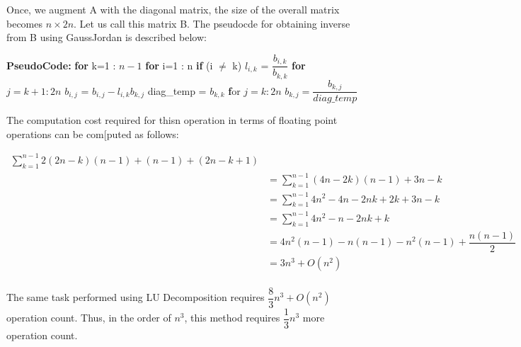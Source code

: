 \documentclass{article}
\newcommand\pseudoCode{\vspace{.10in}\textbf{PseudoCode: }}
\begin{document}
Once, we augment A with  the diagonal matrix, the size of the overall matrix becomes $n \times 2n$. Let us call this matrix B. The pseudocde for obtaining inverse from B using GaussJordan is described below: \newline

\pseudoCode \newline
\hspace*{0.5cm} \textbf {for} k=1 : $n-1$ \newline
\hspace*{1cm}      \textbf {for} i=1 : n \newline
\hspace*{1.5cm}     \textbf {if} (i $\neq$ k) \newline
\hspace*{2cm}            $l_{i,k}$ = $\dfrac{b_{i,k}}{b_{k,k}}$ \newline
\hspace*{2cm}               \textbf {for} $j=k+1 : 2n$ \newline
\hspace*{2.5cm}               $ b_{i,j}$ =  $b_{i,j} - l_{i,k}b_{k,j}$ \newline
\hspace*{1cm}    diag\_temp = $b_{k,k}$ \newline
\hspace*{1cm}    \textbf for $j=k:2n$ \newline
\hspace*{1.5cm}                 $b_{k,j} = \dfrac{b_{k,j}}{diag\_temp}$ \newline

The computation cost required for thisn operation in terms of floating point operations can be com[puted as follows: \newline
  
\begin{align*}
  \sum_{k=1}^{n-1} 2(2n-k)(n-1) + (n-1) + (2n - k + 1) \\
 &= \sum_{k=1}^{n-1} (4n - 2k)(n-1) + 3n - k \\
 &= \sum_{k=1}^{n-1} 4n^2 -4n -2nk + 2k + 3n - k \\
 &= \sum_{k=1}^{n-1} 4n^2 -n -2nk + k \\
&= 4n^2(n-1) -n(n-1) -n^2(n-1) +\dfrac{n(n-1)}{2} \\
&= 3n^3 + O(n^2) \\
\end{align*}

The same task performed using LU Decomposition requires $\dfrac{8}{3}n^3 + O(n^2)$ operation count. Thus, in the order of $n^3$, this method requires $\dfrac{1}{3}n^3$ more operation count. 
\end{document}
